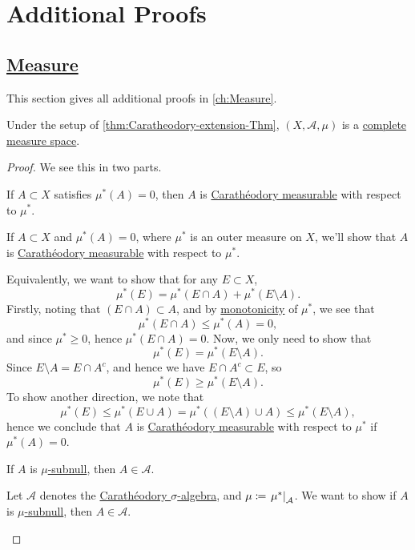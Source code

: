 \chapter{Additional Proofs}\label{Apx:Additional-Proofs}
\section{\hyperref[ch:Measure]{Measure}}
This section gives all additional proofs in \autoref{ch:Measure}.
\begin{theorem}\label{thm:Caratheodory-extension-Thm:3.}
	Under the setup of \autoref{thm:Caratheodory-extension-Thm}, \((X, \mathcal{A} , \mu )\) is a \hyperref[def:complete-measure-space]{complete measure space}.
\end{theorem}
\begin{proof}
	We see this in two parts.
	\begin{claim}
		If \(A\subset X\) satisfies \(\mu ^{\ast} (A) = 0\), then \(A\) is \hyperref[def:C-measurable]{Carathéodory measurable} with respect to \(\mu ^{\ast} \).
	\end{claim}
	\begin{explanation}
		If \(A\subset X\) and \(\mu^{\ast} (A) = 0\), where \(\mu^{\ast} \) is an outer measure on \(X\), we'll show that \(A\) is \hyperref[def:C-measurable]{Carathéodory measurable}
		with respect to \(\mu^{\ast} \).

		\par Equivalently, we want to show that for any \(E\subset X\),
		\[
			\mu^{\ast} (E) = \mu^{\ast} (E\cap A) + \mu^{\ast} (E \setminus A).
		\]
		Firstly, noting that \((E\cap A)\subset A\), and by \hyperref[def:outer-measure-montonicity]{monotonicity} of \(\mu^{\ast} \), we see that
		\[
			\mu^{\ast} (E\cap A)\leq \mu^{\ast} (A) = 0,
		\]
		and since \(\mu^{\ast} \geq 0\), hence \(\mu^{\ast} (E\cap A) = 0\). Now, we only need to show that
		\[
			\mu^{\ast} (E) = \mu^{\ast} (E\setminus A).
		\]
		Since \(E\setminus A = E\cap A^{c} \), and hence we have \(E\cap A^{c} \subset E\), so
		\[
			\mu^{\ast} (E)\geq \mu^{\ast} (E\setminus A).
		\]
		To show another direction, we note that
		\[
			\mu^{\ast} (E)\leq \mu^{\ast} (E\cup A) = \mu^{\ast} ((E\setminus A) \cup A) \leq \mu^{\ast} (E\setminus A),
		\]
		hence we conclude that \(A\) is \hyperref[def:C-measurable]{Carathéodory measurable} with respect to \(\mu^{\ast} \) if \(\mu^{\ast} (A)=0\).
	\end{explanation}

	\begin{claim}
		If \(A\) is \hyperref[def:mu-subnull-set]{\(\mu\)-subnull}, then \(A\in \mathcal{A} \).
	\end{claim}
	\begin{explanation}
		Let \(\mathcal{A} \) denotes the \hyperref[thm:Caratheodory-extension-Thm]{Carathéodory \(\sigma\)-algebra}, and \(\mu\coloneqq \left.\mu^{\ast} \right\vert_{\mathcal{A} }^{} \). We want to show if
		\(A\) is \hyperref[def:mu-subnull-set]{\(\mu\)-subnull}, then \(A\in\mathcal{A} \).


\end{explanation}
\end{proof}
